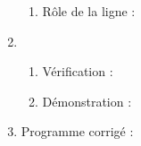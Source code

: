 \documentclass[a4paper,12pt]{article}
\begin{document}
\begin{enumerate}[\bfseries 1.]
\begin{enumerate}[\bfseries a.]
		\item Rôle de la ligne   :\\
		
	\end{enumerate}
	\item 	\begin{enumerate}[\bfseries a.]

		\item 	Vérification :\\
		
		
		\item 	Démonstration :\\
		
	\end{enumerate}
	\item 	Programme corrigé :\\ 
	
\end{enumerate}
\end{document}
